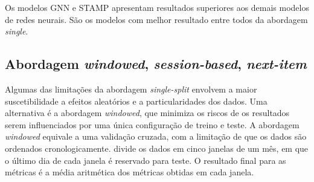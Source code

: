 Os modelos GNN e STAMP apresentam resultados superiores aos demais modelos de
redes neurais. São os modelos com melhor resultado entre todos da abordagem
\textit{single}.




\subsection{Abordagem \textit{windowed}, \textit{session-based}, \textit{next-item}}
Algumas das limitações da abordagem \textit{single-split} envolvem a maior
suscetibilidade a efeitos aleatórios e a particularidades dos dados. Uma
alternativa é a abordagem \textit{windowed}, que minimiza os riscos de os
resultados serem influenciados por uma única configuração de treino e teste. A
abordagem \textit{windowed} equivale a uma validação cruzada, com a limitação de
que os dados são ordenados cronologicamente. \citet{ludewig_2018} divide os
dados em cinco janelas de um mês, em que o último dia de cada janela é reservado
para teste. O resultado final para as métricas é a média aritmética dos
métricas obtidas em cada janela.



